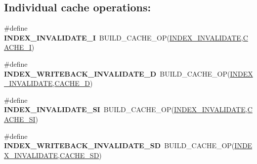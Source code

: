 \subsection*{Individual cache operations\+:}
\begin{DoxyCompactItemize}
\item 
\mbox{\label{group__mips__regs_ga8aab81bcc7c9b90052cd2bb3de1855ef}} 
\#define {\bfseries I\+N\+D\+E\+X\+\_\+\+I\+N\+V\+A\+L\+I\+D\+A\+T\+E\+\_\+I}~B\+U\+I\+L\+D\+\_\+\+C\+A\+C\+H\+E\+\_\+\+OP(\mbox{\hyperlink{group__mips__regs_ga3e91cd07b1e94f7658a7d5547a9118d6}{I\+N\+D\+E\+X\+\_\+\+I\+N\+V\+A\+L\+I\+D\+A\+TE}},\mbox{\hyperlink{group__mips__regs_gac038c307d75c414069699d4c2741714f}{C\+A\+C\+H\+E\+\_\+I}})
\item 
\mbox{\label{group__mips__regs_ga3a489d9cb1b1574ef9054d8b864f06d1}} 
\#define {\bfseries I\+N\+D\+E\+X\+\_\+\+W\+R\+I\+T\+E\+B\+A\+C\+K\+\_\+\+I\+N\+V\+A\+L\+I\+D\+A\+T\+E\+\_\+D}~B\+U\+I\+L\+D\+\_\+\+C\+A\+C\+H\+E\+\_\+\+OP(\mbox{\hyperlink{group__mips__regs_ga3e91cd07b1e94f7658a7d5547a9118d6}{I\+N\+D\+E\+X\+\_\+\+I\+N\+V\+A\+L\+I\+D\+A\+TE}},\mbox{\hyperlink{group__mips__regs_ga0fba561a0aa459e322839f78cc09f839}{C\+A\+C\+H\+E\+\_\+D}})
\item 
\mbox{\label{group__mips__regs_ga3f89388fb000608a1506d2727e285010}} 
\#define {\bfseries I\+N\+D\+E\+X\+\_\+\+I\+N\+V\+A\+L\+I\+D\+A\+T\+E\+\_\+\+SI}~B\+U\+I\+L\+D\+\_\+\+C\+A\+C\+H\+E\+\_\+\+OP(\mbox{\hyperlink{group__mips__regs_ga3e91cd07b1e94f7658a7d5547a9118d6}{I\+N\+D\+E\+X\+\_\+\+I\+N\+V\+A\+L\+I\+D\+A\+TE}},\mbox{\hyperlink{group__mips__regs_gaa127e30b313e010b0c7b53c97503b6ce}{C\+A\+C\+H\+E\+\_\+\+SI}})
\item 
\mbox{\label{group__mips__regs_ga5341f227259614b7f5bdce9768c798b8}} 
\#define {\bfseries I\+N\+D\+E\+X\+\_\+\+W\+R\+I\+T\+E\+B\+A\+C\+K\+\_\+\+I\+N\+V\+A\+L\+I\+D\+A\+T\+E\+\_\+\+SD}~B\+U\+I\+L\+D\+\_\+\+C\+A\+C\+H\+E\+\_\+\+OP(\mbox{\hyperlink{group__mips__regs_ga3e91cd07b1e94f7658a7d5547a9118d6}{I\+N\+D\+E\+X\+\_\+\+I\+N\+V\+A\+L\+I\+D\+A\+TE}},\mbox{\hyperlink{group__mips__regs_gae713c0e6cb5df3df0030d5d87bb16a6d}{C\+A\+C\+H\+E\+\_\+\+SD}})
\item 
\mbox{\label{group__mips__regs_gaf9895e899ca07b7444bca0dbe3aa3e46}} 

\end{DoxyCompactItemize}
